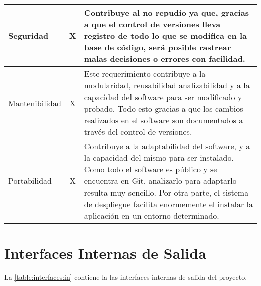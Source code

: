 \begin{center}
\begin{tabular}{ | p{2cm}| p{8cm} | p{5cm} |}
    \multicolumn{1}{|p{3.5cm}|}{\nohyphens{Seguridad}} & \multicolumn{1}{|c|}{X} & \multicolumn{1}{|p{10cm}|}{Contribuye al no repudio ya que, gracias a que el control de versiones lleva registro de todo lo que se modifica en la base de código, será posible rastrear malas decisiones o errores con facilidad.} \\ \hline
    
    \multicolumn{1}{|p{3.5cm}|}{\nohyphens{Mantenibilidad}} & \multicolumn{1}{|c|}{X} & \multicolumn{1}{|p{10cm}|}{Este requerimiento contribuye a la modularidad, reusabilidad analizabilidad y a la capacidad del software para ser modificado y probado. Todo esto gracias a que los cambios realizados en el software son documentados a través del control de versiones.} \\ \hline
    
    \multicolumn{1}{|p{3.5cm}|}{\nohyphens{Portabilidad}} & \multicolumn{1}{|c|}{X} & \multicolumn{1}{|p{10cm}|}{Contribuye a la adaptabilidad del software, y a la capacidad del mismo para ser instalado. Como todo el software es público y se encuentra en Git, analizarlo para adaptarlo resulta muy sencillo. Por otra parte, el sistema de despliegue facilita enormemente el instalar la aplicación en un entorno determinado.} \\
    \hline
  \end{tabular}
  
  \label{table:rnf:vcs}
\end{center}

\section{Interfaces Internas de Salida}
La \autoref{table:interfaces:in} contiene la las interfaces internas de salida del proyecto.

